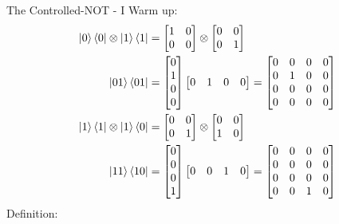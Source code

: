 \documentclass{beamer}
\begin{document}
\begin{frame}{The Controlled-NOT - I}
  {\tiny
    Warm up:
    \begin{align*}
      \ket0\bra0 \otimes \ket1\bra1 &= \begin{bmatrix} 1 & 0 \\ 0 & 0 \end{bmatrix} \otimes \begin{bmatrix} 0 & 0 \\ 0 & 1 \end{bmatrix} \\
      \ket{01}\bra{01}
      &= \begin{bmatrix} 0 \\ 1 \\ 0 \\ 0 \end{bmatrix} \begin{bmatrix} 0 & 1 & 0 & 0\end{bmatrix} 
       = \begin{bmatrix} 0 & 0 & 0 & 0 \\ 0 & 1 & 0 & 0 \\ 0 & 0 & 0 & 0 \\ 0 & 0 & 0 & 0 \end{bmatrix} \\
      \ket1\bra1 \otimes \ket1\bra0 &= \begin{bmatrix} 0 & 0 \\ 0 & 1 \end{bmatrix} \otimes \begin{bmatrix} 0 & 0 \\ 1 & 0 \end{bmatrix} \\
      \ket{11}\bra{10}
      &= \begin{bmatrix} 0 \\ 0 \\ 0 \\ 1 \end{bmatrix} \begin{bmatrix} 0 & 0 & 1 & 0\end{bmatrix} 
       = \begin{bmatrix} 0 & 0 & 0 & 0 \\ 0 & 0 & 0 & 0 \\ 0 & 0 & 0 & 0 \\ 0 & 0 & 1 & 0 \end{bmatrix} \\
    \end{align*}
    Definition:
    \begin{align*}

\end{align*}}
\end{frame}
\end{document}
